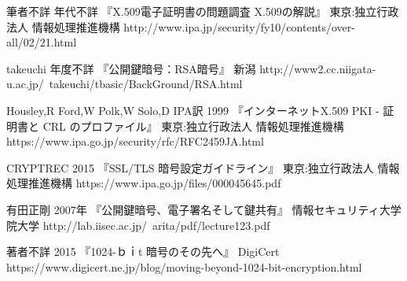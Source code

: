 \begin{thebibliography}{99}
\item
	筆者不詳
	年代不詳
	『X.509電子証明書の問題調査 X.509の解説』
	東京:独立行政法人 情報処理推進機構
	http://www.ipa.jp/security/fy10/contents/over-all/02/21.html
\item
	takeuchi
	年度不詳
	『公開鍵暗号：RSA暗号』
	新潟
	http://www2.cc.niigata-u.ac.jp/~takeuchi/tbasic/BackGround/RSA.html
\item
	Housley,R Ford,W Polk,W Solo,D
	IPA訳
	1999
	『インターネットX.509 PKI - 証明書と CRL のプロファイル』
	東京:独立行政法人 情報処理推進機構
	https://www.ipa.go.jp/security/rfc/RFC2459JA.html	
\item
	CRYPTREC
	2015
	『SSL/TLS 暗号設定ガイドライン』
	東京:独立行政法人 情報処理推進機構
	https://www.ipa.go.jp/files/000045645.pdf
\item
	有田正剛
	2007年
	『公開鍵暗号、電子署名そして鍵共有』
	情報セキュリティ大学院大学
	http://lab.iisec.ac.jp/~arita/pdf/lecture123.pdf
\item
	著者不詳
	2015
	『1024-ｂｉt 暗号のその先へ』
	DigiCert
	https://www.digicert.ne.jp/blog/moving-beyond-1024-bit-encryption.html
\end{thebibliography}